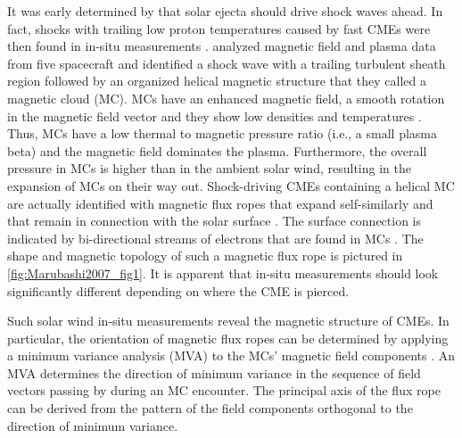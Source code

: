 It was early determined by \citet{Gold1962} that solar ejecta should drive shock waves ahead. In fact, shocks with trailing low proton temperatures caused by fast CMEs were then found in in-situ measurements \citep{Gosling1973,Gosling1974}. \citet{Burlaga1981} analyzed magnetic field and plasma data from five spacecraft and identified a shock wave with a trailing turbulent sheath region followed by an organized helical magnetic structure that they called a magnetic cloud (MC). MCs have an enhanced magnetic field, a smooth rotation in the magnetic field vector and they show low densities and temperatures \citep{Burlaga1981}. Thus, MCs have a low thermal to magnetic pressure ratio (i.e., a small plasma beta) and the magnetic field dominates the plasma. Furthermore, the overall pressure in MCs is higher than in the ambient solar wind, resulting in the expansion of MCs on their way out. Shock-driving CMEs containing a helical MC are actually identified with magnetic flux ropes that expand self-similarly and that remain in connection with the solar surface \citep{Chen1997}. The surface connection is indicated by bi-directional streams of electrons that are found in MCs \citep{Gosling1986}. The shape and magnetic topology of such a magnetic flux rope is pictured in \autoref{fig:Marubashi2007_fig1}. It is apparent that in-situ measurements should look significantly different depending on where the CME is pierced.

Such solar wind in-situ measurements reveal the magnetic structure of CMEs. In  particular, the orientation of magnetic flux ropes can be determined by applying a minimum variance analysis (MVA) to the MCs' magnetic field components \citep{Sonnerup1967,Burlaga1982}. An MVA determines the direction of minimum variance in the sequence of field vectors passing by during an MC encounter. The principal axis of the flux rope can be derived from the pattern of the field components orthogonal to the direction of minimum variance.

